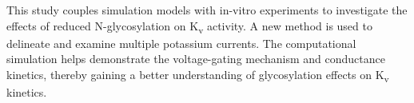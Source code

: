 \documentclass[10pt,letterpaper]{article}
\begin{document}
This study couples simulation models with in-vitro experiments to investigate the effects of reduced N-glycosylation on K\textsubscript{v} activity. A new method is used to delineate and examine multiple potassium currents. The computational simulation helps demonstrate the voltage-gating mechanism and conductance kinetics, thereby gaining a better understanding of glycosylation effects on K\textsubscript{v} kinetics.

% 
% 
% 
% 
% 
% 
\end{document}
